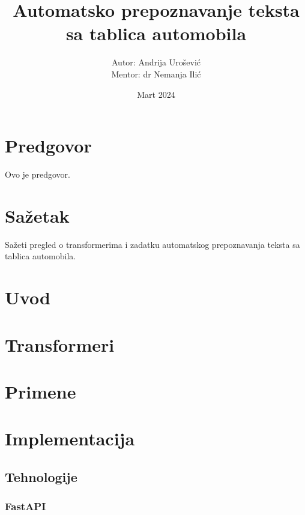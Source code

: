 \documentclass[a4paper,12pt,titlepage]{article}
\begin{document}
	\begin{titlepage}
		\title{Automatsko prepoznavanje teksta sa tablica automobila}
		\author{Autor: Andrija Urošević \\ \footnotesize Mentor: dr Nemanja Ilić}
		\date{Mart 2024}
		\maketitle
	\end{titlepage}
	
	
	\section*{Predgovor}
	Ovo je predgovor. 
	\newpage
	
	\tableofcontents
	\newpage
	
	
	\section*{Sažetak}
	Sažeti pregled o transformerima i zadatku automatskog prepoznavanja teksta sa tablica automobila.
	\newpage
	
	\section{Uvod}
	\newpage
	
	\section{Transformeri}
	\newpage
	
	\section{Primene}
	\newpage
	
	\section{Implementacija}
	\subsection{Tehnologije}
	\subsubsection{FastAPI}
\end{document}
